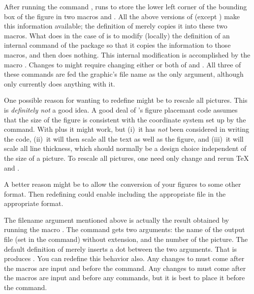 \documentclass[letterpaper]{article}
\begin{document}
After running the command , \mfp{} runs
 to store the lower left corner of the bounding box
of the figure in two macros  and . All the
above versions of  (except )
make this information available; the definition of 
merely copies it into these two macros. What \mfp{} does in the
case of  is to modify (locally) the definition of an
internal command of the  package so that it copies the
information to those macros, and then  does nothing.
This internal modification is accomplished by the macro
. Changes to  might require
changing either or both of  and
. All three of these commands are fed the graphic's
file name as the only argument, although only 
currently does anything with it.

One possible reason for wanting to redefine  might
be to rescale all pictures. This is \emph{definitely not} a good idea. A
good deal of \mfp{}'s figure placemant code assumes that the size of the
figure is consistent with the coordinate system set up by the 
command. With  plus  it might work, but
(i)~it has \emph{not} been considered in writing the \mfp{} code,
(ii)~it will then scale all the text as well as the figure, and (iii)~it
will scale all line thickness, which should normally be a design choice
independent of the size of a picture. To rescale all pictures, one need
only change  and rerun \TeX{} and \MP{}.

A better reason might be to allow the conversion of your \MP{} figures
to some other format. Then redefining 
could enable including the appropriate file in the appropriate format.

The filename argument mentioned above is actually the result obtained by
running the macro .
The command  gets two arguments: the name of the \MP{}
output file (set in the  command) without extension,
and the number of the picture. The default definition of
 merely inserts a dot between the two arguments. That is
 produces . You can
redefine this behavior also. Any changes to  must come
after the \mfp{} macros are input and before the
 command. Any changes to  must
come after the \mfp{} macros are input and before any 
commands, but it is best to place it before the 
command.
\end{document}
